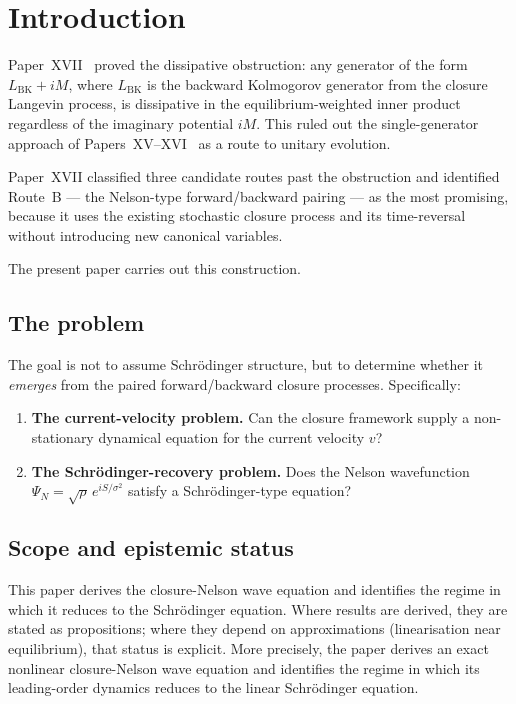 \documentclass[12pt]{article}
\begin{document}
\section{Introduction}\label{sec:intro}

Paper~XVII~\citep{SmartXVII} proved the dissipative obstruction: any generator of the form $L_{\mathrm{BK}} + iM$, where $L_{\mathrm{BK}}$ is the backward Kolmogorov generator from the closure Langevin process, is dissipative in the equilibrium-weighted inner product regardless of the imaginary potential $iM$. This ruled out the single-generator approach of Papers~XV--XVI~\citep{SmartXV, SmartXVI} as a route to unitary evolution.

Paper~XVII classified three candidate routes past the obstruction and identified Route~B --- the Nelson-type forward/backward pairing --- as the most promising, because it uses the existing stochastic closure process and its time-reversal without introducing new canonical variables.

The present paper carries out this construction.

\subsection*{The problem}

The goal is not to assume Schr\"odinger structure, but to determine whether it \textit{emerges} from the paired forward/backward closure processes. Specifically:

\begin{enumerate}
    \item[(P10)] \textbf{The current-velocity problem.} Can the closure framework supply a non-stationary dynamical equation for the current velocity $v$?
    \item[(P11)] \textbf{The Schr\"odinger-recovery problem.} Does the Nelson wavefunction $\Psi_N = \sqrt{\rho}\,e^{iS/\sigma^2}$ satisfy a Schr\"odinger-type equation?
\end{enumerate}

\subsection*{Scope and epistemic status}

This paper derives the closure-Nelson wave equation and identifies the regime in which it reduces to the Schr\"odinger equation. Where results are derived, they are stated as propositions; where they depend on approximations (linearisation near equilibrium), that status is explicit. More precisely, the paper derives an exact nonlinear closure-Nelson wave equation and identifies the regime in which its leading-order dynamics reduces to the linear Schr\"odinger equation.
\end{document}
